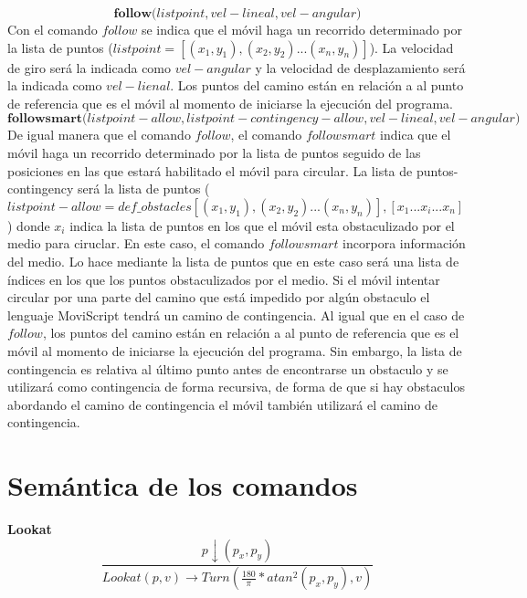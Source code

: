 \documentclass[11pt]{scrartcl}
\begin{document}
\begin{equation*}
\textbf{follow(}listpoint , vel-lineal , vel-angular \textbf{)}
\end{equation*}
Con el comando $follow$ se indica que el m\'ovil haga un recorrido determinado
por la lista de puntos ($listpoint = [(x_1,y_1),(x_2,y_2)...(x_n,y_n)]$).
\newline
La velocidad de giro ser\'a la indicada como $vel-angular$ y la velocidad de desplazamiento
ser\'a la indicada como $vel-lienal$. Los puntos del camino est\'an en relaci\'on a al punto de referencia que
es el m\'ovil al momento de iniciarse la ejecuci\'on del programa.
\begin{equation*}
\textbf{followsmart(}listpoint-allow , listpoint-contingency-allow , vel-lineal , vel-angular \textbf{)}
\end{equation*}                
De igual manera que el comando $follow$, el comando $followsmart$
 indica que el m\'ovil haga un recorrido determinado
por la lista de puntos seguido de las posiciones en las que estar\'a habilitado el m\'ovil 
para circular. La lista de puntos-contingency ser\'a la lista de puntos
($listpoint-allow = def\_obstacles [(x_1,y_1),(x_2,y_2)...(x_n,y_n)], [x_1 ... x_i ... x_n]$) donde
$x_i$ indica la lista de puntos en los que el m\'ovil esta obstaculizado por el medio para ciruclar.
\newline
En este caso, el comando $followsmart$ incorpora informaci\'on del medio. Lo hace mediante la lista de puntos que en este caso
ser\'a una lista de \'indices en los que los puntos obstaculizados por el medio.
\newline
Si  el m\'ovil intentar circular por una parte del camino que est\'a impedido por alg\'un 
obstaculo el lenguaje MoviScript tendr\'a un camino de contingencia. Al igual que en el caso de $follow$,
los puntos del camino est\'an en relaci\'on a al punto de referencia que
es el m\'ovil al momento de iniciarse la ejecuci\'on del programa. Sin embargo, 
la lista de contingencia es relativa al \'ultimo punto antes de encontrarse un obstaculo 
y se utilizar\'a como contingencia de forma  recursiva, de forma de que si hay 
obstaculos abordando el camino de contingencia el m\'ovil 
tambi\'en utilizar\'a el camino de contingencia.

\section{Sem\'antica de los comandos}
\textbf{Lookat}
\[
 \frac{p \downarrow (p_x,p_y)}{Lookat(p, v) \to Turn( \frac{180} {\pi} * atan^2(p_x, p_y) , v)}
\]
\end{document}

